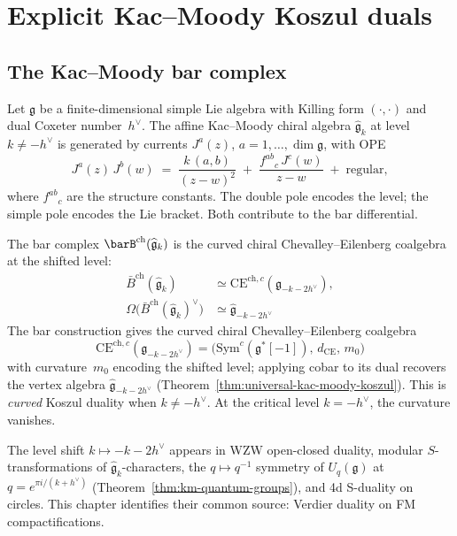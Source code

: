 \chapter{Explicit Kac--Moody Koszul duals}\label{chap:kac-moody-koszul}
\label{chap:kac-moody}

\section{The Kac--Moody bar complex}%
\label{sec:km-bar-complex}

Let $\mathfrak{g}$ be a finite-dimensional simple Lie algebra with
Killing form $(\cdot,\cdot)$ and dual Coxeter number~$h^\vee$.
The affine Kac--Moody chiral algebra $\widehat{\mathfrak{g}}_k$
at level $k \neq -h^\vee$ is generated by currents
$J^a(z)$, $a = 1, \ldots, \dim \mathfrak{g}$, with OPE
\[
  J^a(z)\,J^b(w) \;=\; \frac{k\,(a,b)}{(z-w)^2}
  \;+\; \frac{f^{ab}{}_c \, J^c(w)}{z-w}
  \;+\; \text{regular},
\]
where $f^{ab}{}_c$ are the structure constants.  The double pole
encodes the level; the simple pole encodes the Lie bracket.  Both
contribute to the bar differential.

The bar complex $\barB^{\mathrm{ch}}(\widehat{\mathfrak{g}}_k)$ is
the curved chiral Chevalley--Eilenberg coalgebra at the shifted level:
\begin{align}\label{eq:kac-moody-koszul-basic}
\bar{B}^{\mathrm{ch}}(\widehat{\mathfrak{g}}_k) &\simeq \mathrm{CE}^{\mathrm{ch},c}(\mathfrak{g}_{-k-2h^\vee}), \nonumber\\
\Omega\bigl(\bar{B}^{\mathrm{ch}}(\widehat{\mathfrak{g}}_k)^\vee\bigr) &\simeq \widehat{\mathfrak{g}}_{-k-2h^\vee}
\end{align}
The bar construction gives the curved chiral Chevalley--Eilenberg
coalgebra
\[
\mathrm{CE}^{\mathrm{ch},c}(\mathfrak{g}_{-k-2h^\vee})
= \bigl(\mathrm{Sym}^c(\mathfrak{g}^*[-1]),\, d_{\mathrm{CE}},\, m_0\bigr)
\]
with curvature~$m_0$ encoding the shifted level; applying cobar
to its dual recovers the vertex algebra
$\widehat{\mathfrak{g}}_{-k-2h^\vee}$
(Theorem~\ref{thm:universal-kac-moody-koszul}).
This is \emph{curved} Koszul duality when $k \neq -h^\vee$.
At the critical level $k = -h^\vee$, the curvature vanishes.

\begin{remark}
The level shift $k \mapsto -k - 2h^\vee$ appears in WZW open-closed duality, modular $S$-transformations of $\widehat{\mathfrak{g}}_k$-characters, the $q \mapsto q^{-1}$ symmetry of $U_q(\mathfrak{g})$ at $q = e^{\pi i/(k+h^\vee)}$ (Theorem~\ref{thm:km-quantum-groups}), and 4d S-duality on circles.  This chapter identifies their common source: Verdier duality on FM compactifications.
\end{remark}

